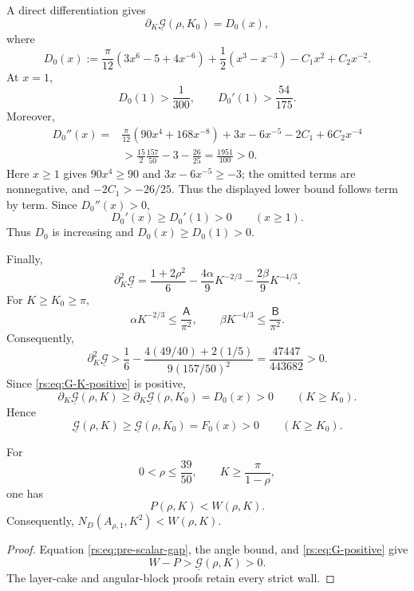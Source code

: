 A direct differentiation gives
\begin{equation}
 \partial_K\underline{\mathcal G}(\rho,K_0)=D_0(x),
 \label{rs:eq:base-derivative}
\end{equation}
where
\begin{equation}
 D_0(x):=
 \frac\pi{12}(3x^6-5+4x^{-6})
 +\frac12(x^3-x^{-3})-C_1x^2+C_2x^{-2}.
 \label{rs:eq:D0}
\end{equation}
At $x=1$,
\begin{equation}
 D_0(1)>\frac1{300},
 \qquad D_0'(1)>\frac{54}{175}.
 \label{rs:eq:D0-endpoint}
\end{equation}
Moreover,
\begin{equation}
 \begin{aligned}
 D_0''(x)={}&\frac\pi{12}(90x^4+168x^{-8})
 +3x-6x^{-5}-2C_1+6C_2x^{-4}\\
 &>\frac{15}{2}\frac{157}{50}-3-\frac{26}{25}
 =\frac{1951}{100}>0.
 \end{aligned}
 \label{rs:eq:D0-convex}
\end{equation}
Here $x\geq1$ gives $90x^4\geq90$ and
$3x-6x^{-5}\geq-3$; the omitted terms are nonnegative, and
$-2C_1>-26/25$.  Thus the displayed lower bound follows term by term.
Since $D_0''(x)>0$,
\[
 D_0'(x)\geq D_0'(1)>0\qquad(x\geq1).
\]
Thus $D_0$ is increasing and $D_0(x)\geq D_0(1)>0$.

Finally,
\begin{equation}
 \partial_K^2\underline{\mathcal G}
 =\frac{1+2\rho^2}{6}
 -\frac{4\alpha}{9}K^{-2/3}
 -\frac{2\beta}{9}K^{-4/3}.
 \label{rs:eq:G-K-convex}
\end{equation}
For $K\geq K_0\geq\pi$,
\[
 \alpha K^{-2/3}\leq\frac{\mathsf A}{\pi^2},
 \qquad
 \beta K^{-4/3}\leq\frac{\mathsf B}{\pi^2}.
\]
Consequently,
\begin{equation}
 \partial_K^2\underline{\mathcal G}
 >\frac16-
 \frac{4(49/40)+2(1/5)}{9(157/50)^2}
 =\frac{47447}{443682}>0.
 \label{rs:eq:G-K-positive}
\end{equation}
Since \eqref{rs:eq:G-K-positive} is positive,
\[
 \partial_K\underline{\mathcal G}(\rho,K)
 \geq\partial_K\underline{\mathcal G}(\rho,K_0)
 =D_0(x)>0
 \qquad(K\geq K_0).
\]
Hence
\begin{equation}
 \underline{\mathcal G}(\rho,K)
 \geq\underline{\mathcal G}(\rho,K_0)
 =F_0(x)>0
 \qquad(K\geq K_0).
 \label{rs:eq:G-positive}
\end{equation}

\begin{theorem}
\label{rs:thm:global-proxy}
For
\[
 0<\rho\leq\frac{39}{50},
 \qquad K\geq\frac\pi{1-\rho},
\]
one has
\begin{equation}
 P(\rho,K)<W(\rho,K).
 \label{rs:eq:proxy-conclusion}
\end{equation}
Consequently,
$N_D(A_{\rho,1},K^2)<W(\rho,K)$.
\end{theorem}

\begin{proof}
Equation \eqref{rs:eq:pre-scalar-gap}, the angle bound, and
\eqref{rs:eq:G-positive} give
\[
 W-P>\underline{\mathcal G}(\rho,K)>0.
\]
The layer-cake and angular-block proofs retain every strict wall.
\end{proof}
